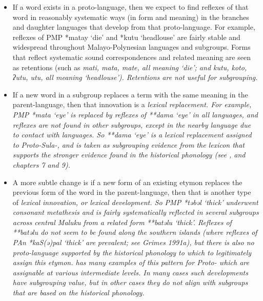 \begin{itemize}
	\item	If a word exists in a proto-language,
				then we expect to find reflexes of that word in reasonably systematic
				ways (in form and meaning) in the branches
				and daughter languages that develop from that proto-language.
				For example, reflexes of PMP *matay ‘die’
				and *kutu ‘headlouse’ are fairly stable
				and widespread throughout Malayo-Polynesian languages and subgroups.
				Forms that reflect systematic sound correspondences
				and related meaning are seen as retentions (such as \it{mati,
				mata, mate}, all meaning ‘die’; and \it{kutu,
				koto, ʔutu, utu}, all meaning ‘headlouse’).
				Retentions are not useful for subgrouping.

	\item	If a new word in a subgroup replaces a term with the same meaning
				in the parent-language, then that innovation is a \it{lexical replacement}.
				For example, PMP *mata ‘eye’ is replaced by reflexes of **dama
				‘eye’ in all  languages,
				and reflexes are not found in other subgroups,
				except in the nearby  language due to contact with  languages.
				So **dama ‘eye’ is a lexical replacement assigned to Proto-Sula-,
				and is taken as subgrouping evidence from the lexicon that supports
				the stronger evidence found in the historical phonology (see
				, and chapters 7 and 9).

	\item	A more subtle change is if a new form of an existing etymon
				replaces the previous form of the word in the parent-language,
				then that is another type of \it{lexical innovation}, or lexical development.
				So PMP *təbəl ‘thick’ underwent consonant metathesis
				and is fairly systematically reflected in several subgroups across
				central Maluku from a related form **batəlu ‘thick’.
				Reflexes of **batəlu do not seem to be found along the southern
				islands (where reflexes of PAn *kaS(ə)pal ‘thick’ are prevalent;
				see Grimes 1991a), but there is also no proto-language supported by the historical
				phonology to which to legitimately assign this etymon.
				\citet{Edwards2021} has many examples of this pattern for Proto-
				which are assignable at various intermediate levels.
				In many cases such developments have subgrouping value,
				but in other cases they do not align with subgroups that are
				based on the historical phonology.


\end{itemize}
